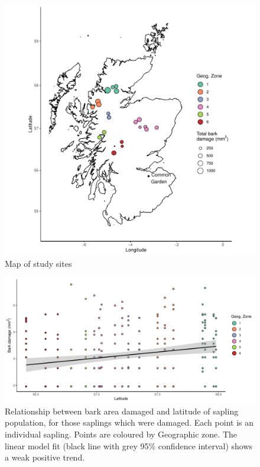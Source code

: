 \documentclass[a4paper, 11pt]{article}
\begin{document}
\begin{figure}
	\includegraphics[width=\textwidth]{bubble_map}	
	\caption{Map of study sites}
\end{figure}

\begin{figure}
	\includegraphics[width=\textwidth]{latitude}
	\caption{Relationship between bark area damaged and latitude of sapling population, for those saplings which were damaged. Each point is an individual sapling. Points are coloured by Geographic zone. The linear model fit (black line with grey 95\% confidence interval) shows a weak positive trend.}
	\label{latitude}
\end{figure}
\end{document}
